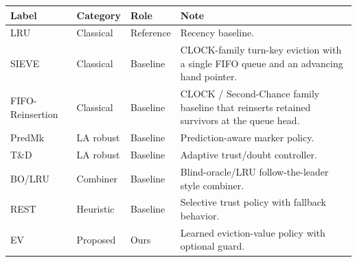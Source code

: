 \begin{tabular}{@{}l l p{2.05cm} p{5.75cm}@{}}
\toprule
Label & Category & Role & Note \\
\midrule
LRU & Classical & Reference & Recency baseline. \\
SIEVE & Classical & Baseline & CLOCK-family turn-key eviction with a single FIFO queue and an advancing hand pointer. \\
FIFO-Reinsertion & Classical & Baseline & CLOCK / Second-Chance family baseline that reinserts retained survivors at the queue head. \\
PredMk & LA robust & Baseline & Prediction-aware marker policy. \\
T\&D & LA robust & Baseline & Adaptive trust/doubt controller. \\
BO/LRU & Combiner & Baseline & Blind-oracle/LRU follow-the-leader style combiner. \\
REST & Heuristic & Baseline & Selective trust policy with fallback behavior. \\
EV & Proposed & Ours & Learned eviction-value policy with optional guard. \\
\bottomrule
\end{tabular}
